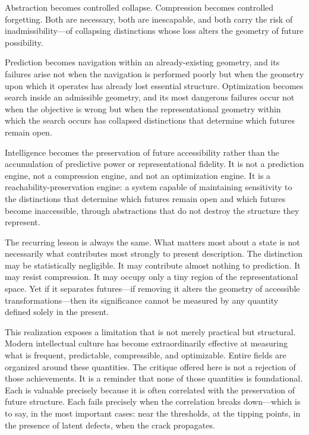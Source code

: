 \documentclass[12pt,a4paper]{article}
\theoremstyle{plain}
\theoremstyle{definition}
\theoremstyle{remark}
\begin{document}
Abstraction becomes controlled collapse. Compression becomes controlled
forgetting. Both are necessary, both are inescapable, and both carry the
risk of inadmissibility---of collapsing distinctions whose loss
alters the geometry of future possibility.

Prediction becomes navigation within an already-existing geometry, and its
failures arise not when the navigation is performed poorly but when the
geometry upon which it operates has already lost essential structure.
Optimization becomes search inside an admissible geometry, and its most
dangerous failures occur not when the objective is wrong but when the
representational geometry within which the search occurs has collapsed
distinctions that determine which futures remain open.

Intelligence becomes the preservation of future accessibility rather than
the accumulation of predictive power or representational fidelity. It is
not a prediction engine, not a compression engine, and not an optimization
engine. It is a reachability-preservation engine: a system capable of
maintaining sensitivity to the distinctions that determine which futures
remain open and which futures become inaccessible, through abstractions
that do not destroy the structure they represent.

The recurring lesson is always the same. What matters most about a state is
not necessarily what contributes most strongly to present description. The
distinction may be statistically negligible. It may contribute almost nothing
to prediction. It may resist compression. It may occupy only a tiny region
of the representational space. Yet if it separates futures---if removing
it alters the geometry of accessible transformations---then its significance
cannot be measured by any quantity defined solely in the present.

This realization exposes a limitation that is not merely practical but
structural. Modern intellectual culture has become extraordinarily effective
at measuring what is frequent, predictable, compressible, and optimizable.
Entire fields are organized around these quantities. The critique offered
here is not a rejection of those achievements. It is a reminder that none of
those quantities is foundational. Each is valuable precisely because it is
often correlated with the preservation of future structure. Each fails
precisely when the correlation breaks down---which is to say, in the most
important cases: near the thresholds, at the tipping points, in the presence
of latent defects, when the crack propagates.
\end{document}

